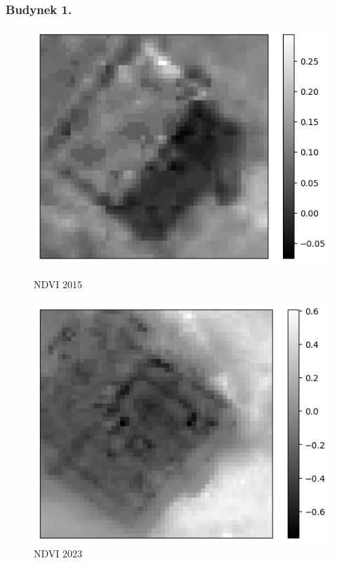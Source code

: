 \documentclass[a4paper,12pt]{article}  %
\begin{document}
\subsubsection{Budynek 1.}
\begin{figure}[H]
    \centering
    \begin{minipage}{0.45\textwidth}
        \centering
        \includegraphics[width=\linewidth]{spektralne/ndvi_budynek7_2015.png}
        \caption*{NDVI 2015}
    \end{minipage}
    \begin{minipage}{0.45\textwidth}
        \centering
        \includegraphics[width=\linewidth]{spektralne/ndvi_budynek7_2023.png}
        \caption*{NDVI 2023}
    \end{minipage}
\end{figure}
\end{document}

